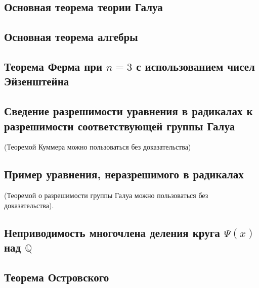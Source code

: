 \documentclass[../main.tex]{subfiles}
\begin{document}
\hypertarget{9.4}{\subsection{Основная теорема теории Галуа}}

\hypertarget{9.5}{\subsection{Основная теорема алгебры}}

\hypertarget{9.6}{\subsection{Теорема Ферма при $n = 3$ с использованием чисел Эйзенштейна}}

\hypertarget{9.7}{\subsection{Сведение разрешимости уравнения в радикалах к разрешимости соответствующей группы Галуа}}
(Теоремой Куммера можно пользоваться без доказательства)
\hypertarget{9.8}{\subsection{Пример уравнения, неразрешимого в радикалах}}
(Теоремой о разрешимости группы Галуа можно пользоваться без доказательства).

\hypertarget{9.9}{\subsection{Неприводимость многочлена деления круга $\Psi(x)$ над $\mathbb{Q}$}}

\hypertarget{9.10}{\subsection{Теорема Островского}}
\end{document}
